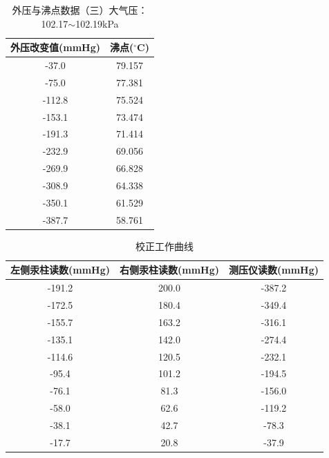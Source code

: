 \documentclass[12pt]{ctexart}
\numberwithin{equation}{section}
\begin{document}
\newpage
\begin{longtable}{cc}
    \caption{外压与沸点数据（三）大气压：102.17$\sim$102.19kPa} \\
    \hline
    外压改变值(mmHg) & 沸点($^\circ$C) \\
    \hline
    -37.0  & 79.157 \\
    -75.0  & 77.381 \\
    -112.8 & 75.524 \\
    -153.1 & 73.474 \\
    -191.3 & 71.414 \\
    -232.9 & 69.056 \\
    -269.9 & 66.828 \\
    -308.9 & 64.338 \\
    -350.1 & 61.529 \\
    -387.7 & 58.761 \\
    \hline
\end{longtable}

\begin{longtable}{ccc}
    \caption{校正工作曲线} \\
    \hline
    左侧汞柱读数(mmHg) & 右侧汞柱读数(mmHg) & 测压仪读数(mmHg) \\
    \hline
    -191.2 & 200.0 & -387.2 \\
    -172.5 & 180.4 & -349.4 \\
    -155.7 & 163.2 & -316.1 \\
    -135.1 & 142.0 & -274.4 \\
    -114.6 & 120.5 & -232.1 \\
    -95.4  & 101.2 & -194.5 \\
    -76.1  & 81.3  & -156.0 \\
    -58.0  & 62.6  & -119.2 \\
    -38.1  & 42.7  & -78.3  \\
    -17.7  & 20.8  & -37.9  \\
    \hline
\end{longtable}
\end{document}
